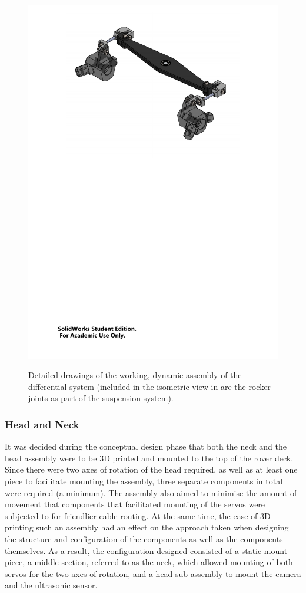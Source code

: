 \begin{figure}[h!]
{          \includegraphics[clip, trim=4cm 17cm 4cm 1cm, width=0.7\linewidth]{figures/diff-sub-iso}
        }
        \caption[Detailed drawings of the working, dynamic assembly of the differential system.]{Detailed drawings of the working, dynamic assembly of the differential system (included in the isometric view in \protect{} are the rocker joints as part of the suspension system).}
        \label{fig:mechDesign-differentialSubDetail}
        \end{figure}
        
              
    \subsubsection{Head and Neck}
      It was decided during the conceptual design phase that both the neck and the head assembly were to be 3D printed and mounted to the top of the rover deck. Since there were two axes of rotation of the head required, as well as at least one piece to facilitate mounting the assembly, three separate components in total were required (a minimum). The assembly also aimed to minimise the amount of movement that components that facilitated mounting of the servos were subjected to for friendlier cable routing. At the same time, the ease of 3D printing such an assembly had an effect on the approach taken when designing the structure and configuration of the components as well as the components themselves. As a result, the configuration designed consisted of a static mount piece, a middle section, referred to as the neck, which allowed mounting of both servos for the two axes of rotation, and a head sub-assembly to mount the camera and the ultrasonic sensor.
      
